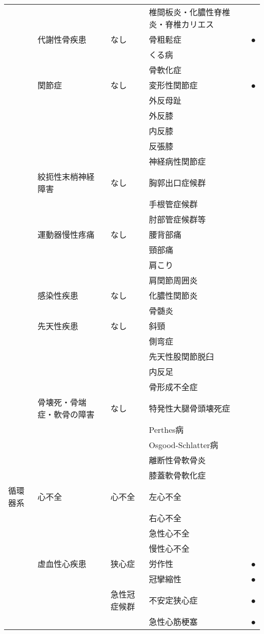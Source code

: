 \begin{xltabular}{\linewidth}{XXXXX}
 &  &  & 椎間板炎・化膿性脊椎炎・脊椎カリエス &  \\
 & 代謝性骨疾患 & なし & 骨粗鬆症 & ● \\
 &  &  & くる病 &  \\
 &  &  & 骨軟化症 &  \\
 & 関節症 & なし & 変形性関節症 & ● \\
 &  &  & 外反母趾 &  \\
 &  &  & 外反膝 &  \\
 &  &  & 内反膝 &  \\
 &  &  & 反張膝 &  \\
 &  &  & 神経病性関節症 &  \\
 & 絞扼性末梢神経障害 & なし & 胸郭出口症候群 &  \\
 &  &  & 手根管症候群 &  \\
 &  &  & 肘部管症候群等 &  \\
 & 運動器慢性疼痛 & なし & 腰背部痛 &  \\
 &  &  & 頸部痛 &  \\
 &  &  & 肩こり &  \\
 &  &  & 肩関節周囲炎 &  \\
 & 感染性疾患 & なし & 化膿性関節炎 &  \\
 &  &  & 骨髄炎 &  \\
 & 先天性疾患 & なし & 斜頸 &  \\
 &  &  & 側弯症 &  \\
 &  &  & 先天性股関節脱臼 &  \\
 &  &  & 内反足 &  \\
 &  &  & 骨形成不全症 &  \\
 & 骨壊死・骨端症・軟骨の障害 & なし & 特発性大腿骨頭壊死症 &  \\
 &  &  & Perthes病 &  \\
 &  &  & Osgood-Schlatter病 &  \\
 &  &  & 離断性骨軟骨炎 &  \\
 &  &  & 膝蓋軟骨軟化症 &  \\
循環器系 & 心不全 & 心不全 & 左心不全 &  \\
 &  &  & 右心不全 &  \\
 &  &  & 急性心不全 &  \\
 &  &  & 慢性心不全 &  \\
 & 虚血性心疾患 & 狭心症 & 労作性 & ● \\
 &  &  & 冠攣縮性 & ● \\
 &  & 急性冠症候群 & 不安定狭心症 & ● \\
 &  &  & 急性心筋梗塞 & ● \\

\end{xltabular}
